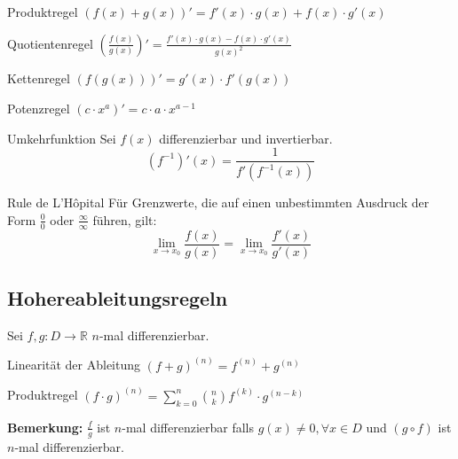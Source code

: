 \documentclass[a4paper,8pt]{extarticle}
\newenvironment{bemerkung}{
   \noindent \textbf{Bemerkung:  }}{}
\def\R{\mathbb{R}}
\begin{document}
\begin{mainbox}{Produktregel}
 $(f(x) + g(x))' = f'(x) \cdot g(x) + f(x) \cdot g'(x)$
\end{mainbox}

\begin{mainbox}{Quotientenregel}
 $\left(\frac{f(x)}{g(x)}\right)' = \frac{f'(x) \cdot g(x) - f(x) \cdot g'(x)}{g(x)^2}$
\end{mainbox}

\begin{mainbox}{Kettenregel}
 $(f(g(x)))' = g'(x) \cdot f'(g(x))$
\end{mainbox}

\begin{subbox}{Potenzregel}
 $(c \cdot x^a)' = c \cdot a \cdot x^{a - 1}$
\end{subbox}

\begin{mainbox}{Umkehrfunktion}
  Sei $f(x)$ differenzierbar und invertierbar. 
  $$(f^{-1})'(x) = \frac{1}{f'(f^{-1}(x))}$$
\end{mainbox}

\begin{mainbox}{Rule de L'Hôpital}
Für Grenzwerte, die auf einen unbestimmten Ausdruck der Form $\frac{0}{0}$ oder $\frac{\infty}{\infty}$ führen, gilt:
\begin{equation*}
  \lim_{x\to x_0} \frac{f(x)}{g(x)} = \lim_{x\to x_0} \frac{f'(x)}{g'(x)}
\end{equation*}
\end{mainbox}

\subsection{Hohereableitungsregeln}
Sei $f, g: D \to \R$ $n$-mal differenzierbar.
\begin{subbox}{Linearität der Ableitung}
  $(f + g) ^{(n)} = f^{(n)} + g^{(n)}$
 \end{subbox}
\begin{mainbox}{Produktregel}
  $(f \cdot g)^{(n)} = \sum_{k=0}^n {n \choose k} f^{(k)} \cdot g^{(n-k)}$
 \end{mainbox}
 \begin{bemerkung}
   $\frac{f}{g}$ ist $n$-mal differenzierbar falls $g(x) \neq 0, \forall x \in D$ und $(g \circ f)$ ist $n$-mal differenzierbar.
 \end{bemerkung}
\end{document}
